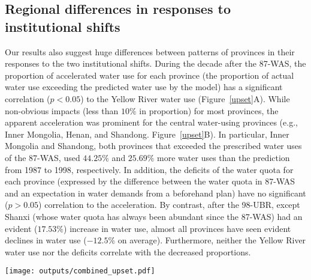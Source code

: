 \subsection{Regional differences in responses to institutional shifts}
\label{result-3}
Our results also suggest huge differences between patterns of provinces in their responses to the two institutional shifts.
During the decade after the 87-WAS, the proportion of accelerated water use for each province (the proportion of actual water use exceeding the predicted water use by the model) has a significant correlation ($p<0.05$) to the Yellow River water use (Figure~\ref{upset}A).
While non-obvious impacts (less than $10\%$ in proportion) for most provinces, the apparent acceleration was prominent for the central water-using provinces (e.g., Inner Mongolia, Henan, and Shandong. Figure~\ref{upset}B).
In particular, Inner Mongolia and Shandong, both provinces that exceeded the prescribed water uses of the 87-WAS, used $44.25\%$ and $25.69\%$ more water uses than the prediction from 1987 to 1998, respectively.
In addition, the deficits of the water quota for each province (expressed by the difference between the water quota in 87-WAS and an expectation in water demands from a beforehand plan) have no significant ($p>0.05$) correlation to the acceleration.
By contrast, after the 98-UBR, except Shanxi (whose water quota has always been abundant since the 87-WAS) had an evident ($17.53\%$) increase in water use, almost all provinces have seen evident declines in water use ($-12.5\%$ on average).
Furthermore, neither the Yellow River water use nor the deficits correlate with the decreased proportions.

\begin{figure*}[!h]
    \centering
    \texttt{[image: outputs/combined\_upset.pdf]}
    \caption{Responses of the provinces to the institutional shifts (upper: the 87-WAS, lower: the 98-UBR).
        \textbf{A.} The partial correlation coefficient between water use (WU) of Yellow River (YR), unsatisfied ratio (compared with requirements in water plan and supply in the 87-WAS), and the average accelerated ratio.
        \textbf{B.} Average accelerated ratio of water uses for each province in the YRB during the decade after 87-WAS (from 1987 to 1998).
        \textbf{Mian users:} Major water consumption provinces (over the median).
        \textbf{Overused:} violate the 87-WAS in average water uses.
    }
    \label{upset}
\end{figure*}
